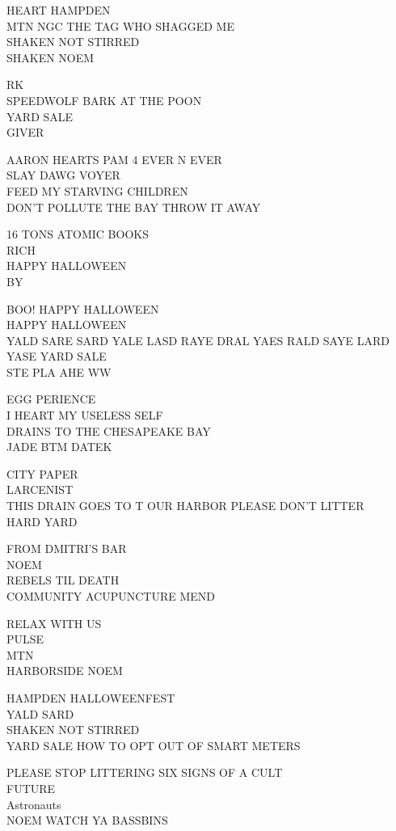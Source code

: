 \documentclass[10pt,letterpaper]{article}
\begin{document}
HEART HAMPDEN\\
MTN NGC THE TAG WHO SHAGGED ME\\
SHAKEN NOT STIRRED\\
SHAKEN NOEM

RK\\
SPEEDWOLF BARK AT THE POON\\
YARD SALE\\
GIVER

AARON HEARTS PAM 4 EVER N EVER\\
SLAY DAWG VOYER\\
FEED MY STARVING CHILDREN\\
DON'T POLLUTE THE BAY THROW IT AWAY

16 TONS ATOMIC BOOKS\\
RICH\\
HAPPY HALLOWEEN\\
BY

BOO! HAPPY HALLOWEEN\\
HAPPY HALLOWEEN\\
YALD SARE SARD YALE LASD RAYE DRAL YAES RALD SAYE LARD YASE YARD SALE\\
STE PLA AHE WW

EGG PERIENCE\\
I HEART MY USELESS SELF\\
DRAINS TO THE CHESAPEAKE BAY\\
JADE BTM DATEK

CITY PAPER\\
LARCENIST\\
THIS DRAIN GOES TO T OUR HARBOR PLEASE DON'T LITTER\\
HARD YARD

FROM DMITRI'S BAR\\
NOEM\\
REBELS TIL DEATH\\
COMMUNITY ACUPUNCTURE MEND

RELAX WITH US\\
PULSE\\
MTN\\
HARBORSIDE NOEM

HAMPDEN HALLOWEENFEST\\
YALD SARD\\
SHAKEN NOT STIRRED\\
YARD SALE HOW TO OPT OUT OF SMART METERS

PLEASE STOP LITTERING SIX SIGNS OF A CULT\\
FUTURE\\
Astronauts\\
NOEM WATCH YA BASSBINS
\end{document}
